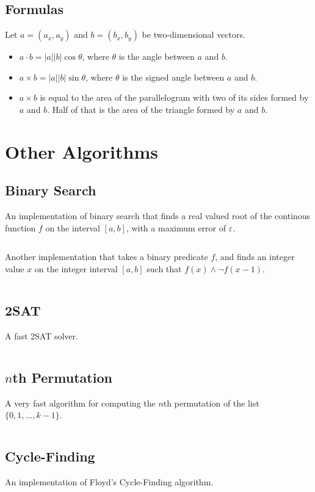 \documentclass[8pt,a4paper]{amsart}
\newcommand{\code}[1]{\inputminted[linenos]{cpp}{_code/#1}}
\begin{document}
    \subsection{Formulas}
        Let $a = (a_x, a_y)$ and $b = (b_x, b_y)$ be two-dimensional vectors.
        \begin{itemize}
            \item $a\cdot b = |a||b|\cos{\theta}$, where $\theta$ is the angle
                between $a$ and $b$.
            \item $a\times b = |a||b|\sin{\theta}$, where $\theta$ is the
                signed angle between $a$ and $b$.
            \item $a\times b$ is equal to the area of the parallelogram with
                two of its sides formed by $a$ and $b$. Half of that is the
                area of the triangle formed by $a$ and $b$.
        \end{itemize}


\section{Other Algorithms}
    \subsection{Binary Search}
        An implementation of binary search that finds a real valued root of the
        continous function $f$ on the interval $[a,b]$, with a maximum error of
        $\varepsilon$.
        \code{other/binary_search_continuous.cpp}

        Another implementation that takes a binary predicate $f$, and finds an
        integer value $x$ on the integer interval $[a,b]$ such that $f(x) \land
        \lnot f(x - 1)$.
        \code{other/binary_search_discrete.cpp}

    \subsection{2SAT}
        A fast 2SAT solver.
        \code{other/two_sat.cpp}

    \subsection{$n$th Permutation}
        A very fast algorithm for computing the $n$th permutation of the list
        $\{0,1,\ldots,k-1\}$.
        \code{other/nth_permutation.cpp}

    \subsection{Cycle-Finding}
        An implementation of Floyd's Cycle-Finding algorithm.
        \code{other/floyds_algorithm.cpp}
\end{document}
